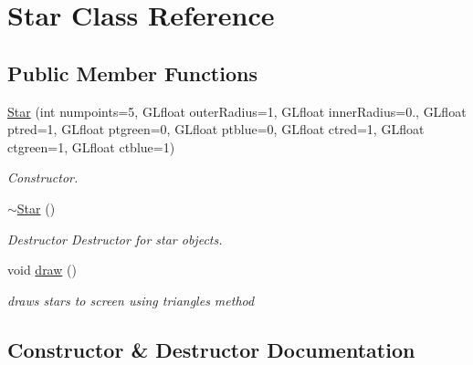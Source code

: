 \hypertarget{class_star}{}\section{Star Class Reference}
\label{class_star}
\subsection*{Public Member Functions}
\begin{DoxyCompactItemize}
\item 
\hyperlink{class_star_afa71c74a140ca164906aea34380e14fe}{Star} (int numpoints=5, G\+Lfloat outer\+Radius=1, G\+Lfloat inner\+Radius=0., G\+Lfloat ptred=1, G\+Lfloat ptgreen=0, G\+Lfloat ptblue=0, G\+Lfloat ctred=1, G\+Lfloat ctgreen=1, G\+Lfloat ctblue=1)
\begin{DoxyCompactList}\small\item\em Constructor. \end{DoxyCompactList}\item 
\mbox{\label{class_star_ac20a90b97d0201576e05aefef2418b94}} 
\hyperlink{class_star_ac20a90b97d0201576e05aefef2418b94}{$\sim$\+Star} ()
\begin{DoxyCompactList}\small\item\em Destructor Destructor for star objects. \end{DoxyCompactList}\item 
\mbox{\label{class_star_afcc12179f236554d2f01b1923adfd669}} 
void \hyperlink{class_star_afcc12179f236554d2f01b1923adfd669}{draw} ()
\begin{DoxyCompactList}\small\item\em draws stars to screen using triangles method \end{DoxyCompactList}\end{DoxyCompactItemize}


\subsection{Constructor \& Destructor Documentation}
\mbox{\label{class_star_afa71c74a140ca164906aea34380e14fe}} 
